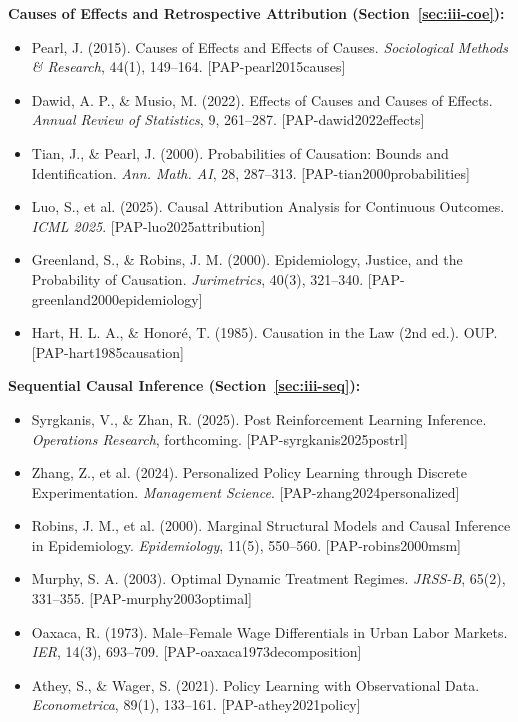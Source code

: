 \textbf{Causes of Effects and Retrospective Attribution (Section~\ref{sec:iii-coe}):}
\begin{itemize}[nosep]
\item Pearl, J. (2015). Causes of Effects and Effects of Causes. \emph{Sociological Methods \& Research}, 44(1), 149--164. [PAP-pearl2015causes]
\item Dawid, A. P., \& Musio, M. (2022). Effects of Causes and Causes of Effects. \emph{Annual Review of Statistics}, 9, 261--287. [PAP-dawid2022effects]
\item Tian, J., \& Pearl, J. (2000). Probabilities of Causation: Bounds and Identification. \emph{Ann. Math. AI}, 28, 287--313. [PAP-tian2000probabilities]
\item Luo, S., et al. (2025). Causal Attribution Analysis for Continuous Outcomes. \emph{ICML 2025}. [PAP-luo2025attribution]
\item Greenland, S., \& Robins, J. M. (2000). Epidemiology, Justice, and the Probability of Causation. \emph{Jurimetrics}, 40(3), 321--340. [PAP-greenland2000epidemiology]
\item Hart, H. L. A., \& Honor{\'e}, T. (1985). Causation in the Law (2nd ed.). OUP. [PAP-hart1985causation]
\end{itemize}

\textbf{Sequential Causal Inference (Section~\ref{sec:iii-seq}):}
\begin{itemize}[nosep]
\item Syrgkanis, V., \& Zhan, R. (2025). Post Reinforcement Learning Inference. \emph{Operations Research}, forthcoming. [PAP-syrgkanis2025postrl]
\item Zhang, Z., et al. (2024). Personalized Policy Learning through Discrete Experimentation. \emph{Management Science}. [PAP-zhang2024personalized]
\item Robins, J. M., et al. (2000). Marginal Structural Models and Causal Inference in Epidemiology. \emph{Epidemiology}, 11(5), 550--560. [PAP-robins2000msm]
\item Murphy, S. A. (2003). Optimal Dynamic Treatment Regimes. \emph{JRSS-B}, 65(2), 331--355. [PAP-murphy2003optimal]
\item Oaxaca, R. (1973). Male--Female Wage Differentials in Urban Labor Markets. \emph{IER}, 14(3), 693--709. [PAP-oaxaca1973decomposition]
\item Athey, S., \& Wager, S. (2021). Policy Learning with Observational Data. \emph{Econometrica}, 89(1), 133--161. [PAP-athey2021policy]
\end{itemize}

